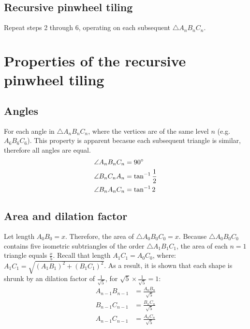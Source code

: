 

\subsection{Recursive pinwheel tiling}
Repeat steps 2 through 6, operating on each subsequent $\triangle A_{n}B_{n}C_{n}$.


\section{Properties of the recursive pinwheel tiling}
\subsection{Angles}
For each angle in $\triangle A_{n}B_{n}C_{n}$, where the vertices are of the same level $n$ (e.g. \angle $A_{6}B_{6}C_{6}$). This property is apparent becasue each subsequent triangle is similar, therefore all angles are equal.
\begin{equation}
    \begin{aligned}
        \angle A_{n}B_{n}C_{n} &= 90\degree \\
        \angle B_{n}C_{n}A_{n} &= \tan^{-1}\frac{1}{2} \\
        \angle B_{n}A_{n}C_{n} &= \tan^{-1}2
    \end{aligned}
\end{equation}

\subsection{Area and dilation factor}
Let length $A_{0}B_{0} = x$. Therefore, the area of $\triangle A_{0}B_{0}C_{0} = x$. Because $\triangle A_{0}B_{0}C_{0}$ contains five isometric subtriangles of the order $\triangle A_{1}B_{1}C_{1}$, the area of each $n = 1$ triangle equals $\frac{x}{5}$. Recall that length $A_{1}C_{1} = A_{0}C_{0}$, where: $A_{1}C_{1} = \sqrt{(A_{1}B_{1})^2 + (B_{1}C_{1})^2}$. As a result, it is shown that each shape is shrunk by an dilation factor of $\frac{1}{\sqrt{5}}$, for $\sqrt{5} \times \frac{1}{\sqrt{5}} = 1$:
\begin{equation}
    \begin{aligned}
        A_{n-1}B_{n-1} &= \frac{A_{n}B_{n}}{\sqrt{5}} \\
        B_{n-1}C_{n-1} &= \frac{B_{n}C_{n}}{\sqrt{5}} \\
        A_{n-1}C_{n-1} &= \frac{A_{n}C_{n}}{\sqrt{5}}
    \end{aligned}
\end{equation}

